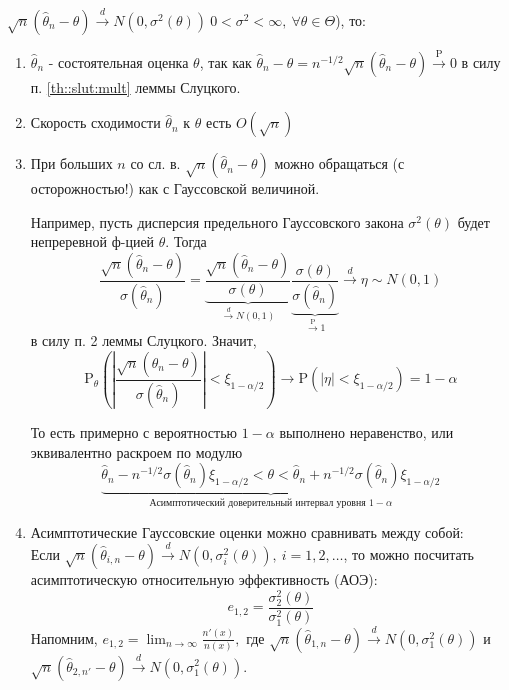 \documentclass[12pt]{article}
\theoremstyle{basic_theorem}
\theoremstyle{name_theorem}
\def\P{
    \mathrm{P}
}
\begin{document}
$\sqrt{n}(\widehat{\theta}_n - \theta) \xrightarrow{d} N(0, \sigma^2(\theta)) \ 0 < \sigma^2 < \infty,\ \forall \theta \in \Theta$), то: \begin{enumerate}

    \item $\widehat{\theta}_n$ - состоятельная оценка $\theta$, так как $\widehat{\theta}_n - \theta = n^{-1/2} \sqrt{n}(\widehat{\theta}_n - \theta) \xrightarrow{\P} 0$ 
        в силу п. \ref{th::slut:mult} леммы Слуцкого.
    \item Скорость сходимости $\widehat{\theta}_n$ к $\theta$ есть $O(\sqrt{n})$
    \item При больших $n$ со сл. в. $\sqrt{n}(\widehat{\theta}_n - \theta)$ можно обращаться (с осторожностью!) как с Гауссовской величиной. 
        
    Например, пусть дисперсия предельного Гауссовского закона $\sigma^2(\theta)$ будет непреревной ф-цией $\theta$. Тогда
        $$ \frac{\sqrt{n}(\widehat{\theta}_n - \theta)}{\sigma(\widehat{\theta}_n)} =
        \underbrace{\frac{\sqrt{n}(\widehat{\theta}_n - \theta)}{\sigma(\theta)}}_{\xrightarrow{d} N(0, 1)}
        \underbrace{\frac{\sigma(\theta)}{\sigma(\widehat{\theta}_n)}}_{\xrightarrow{\P} 1} \xrightarrow{d} \eta \sim N(0, 1)$$
        в силу п. 2 леммы Слуцкого. Значит,
        $$\P_\theta \left(\left\lvert \frac{\sqrt{n}(\widehat{\theta}_n - \theta)}{\sigma(\widehat{\theta}_n)} \right\rvert  < \xi_{1 - \alpha/2}\right) \rightarrow \P(\left\lvert \eta \right\rvert  < \xi_{1 - \alpha/2}) = 1 - \alpha$$

        То есть примерно с вероятностью $1 - \alpha$ выполнено неравенство, или эквивалентно раскроем по модулю
        $$\underbrace{\widehat{\theta}_n - n^{-1/2}\sigma(\widehat{\theta}_n)\xi_{1 - \alpha /2} < \theta < \widehat{\theta}_n + n^{-1/2}\sigma(\widehat{\theta}_n)\xi_{1 - \alpha /2}}_{\mbox{Асимптотический доверительный интервал уровня $1 - \alpha$}}$$

    \item Асимптотические Гауссовские оценки можно сравнивать между собой: \\
    Если $\sqrt{n} (\widehat{\theta}_{i,n} - \theta) \xrightarrow{d} N(0, \sigma^2_{i}(\theta)),\ i = 1, 2, \ldots$, то
    можно посчитать асимптотическую относительную эффективность (АОЭ): 
    $$e_{1,2} = \frac{\sigma_2^2(\theta)}{\sigma_1^2(\theta)}$$
    Напомним, $e_{1, 2} = \lim_{n \to \infty} \frac{n'(x)}{n (x)}, \mbox{ где }
    \sqrt{n}(\widehat{\theta}_{1,n} - \theta) \xrightarrow{d} N(0, \sigma_1^2(\theta))$
    и $\sqrt{n}(\widehat{\theta}_{2,n'} - \theta) \xrightarrow{d} N(0, \sigma_1^2(\theta))$.
\end{enumerate}
\end{document}
